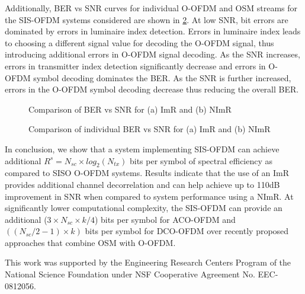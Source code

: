 \documentclass[12pt,letterpaper,onecolumn]{article} %
\begin{document}
Additionally, BER vs SNR curves for individual O-OFDM and OSM streams {\color{red}for the SIS-OFDM systems considered} are shown in \figurename{\ref{fig:BERsplit}}. At low SNR, bit errors are dominated by errors in luminaire index detection. Errors in luminaire index leads to choosing a different signal value for decoding the O-OFDM signal, thus introducing additional errors in O-OFDM signal decoding. As the SNR increases, errors in transmitter index detection significantly decrease and errors in O-OFDM symbol decoding dominates the BER. As the SNR is further increased, errors in the O-OFDM symbol decoding decrease thus reducing the overall BER.
\begin{figure}[!t]
\makebox[\textwidth]{\framebox[3.3in]{\rule{0pt}{2.48in}}}
\caption{Comparison of BER vs SNR for (a) ImR and (b) NImR}
	\label{fig:BERnet}
\end{figure}
\begin{figure}[!t]
\makebox[\textwidth]{\framebox[3.3in]{\rule{0pt}{2.48in}}}
\caption{Comparison of individual BER vs SNR for (a) ImR and (b) NImR}
	\label{fig:BERsplit}
\end{figure}

In conclusion, we show that a system implementing SIS-OFDM can achieve additional $R^s=N_{sc}\times log_2(N_{tx})$ bits per symbol of spectral efficiency as compared to SISO O-OFDM systems. Results indicate that  the use of an ImR provides additional channel decorrelation and can help achieve up to 110dB improvement in SNR when compared to system performance using a NImR. At significantly lower computational complexity, the SIS-OFDM can provide an additional ($3\times N_{sc}\times k/4$) bits per symbol for ACO-OFDM and $((N_{sc}/2 -1)\times k)$ bits per symbol for DCO-OFDM over recently proposed approaches that combine OSM with O-OFDM.

This work was supported by the Engineering Research Centers Program of the National Science Foundation under NSF Cooperative Agreement No. EEC-0812056.


\end{document}
